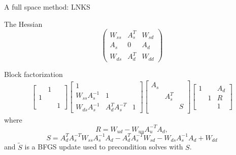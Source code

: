 \documentclass{beamer}
\begin{document}
\begin{frame}[shrink=5]{A full space method: LNKS}
  \begin{block}{The Hessian}
    \begin{equation*}
      \begin{pmatrix}
        W_{ss} & A_s^T & W_{sd} \\
        A_s & 0 & A_d \\
        W_{ds} & A_d^T & W_{dd}
      \end{pmatrix}
    \end{equation*}
  \end{block}
  \begin{block}{Block factorization}
    \begin{align*}
      \begin{bmatrix}
        & 1 & \\
        1 & & \\
        & & 1
      \end{bmatrix}
      \begin{bmatrix}
        1 & & \\
        W_{ss} A_s^{-1} & 1 & \\
        W_{ds} A_s^{-1} & A_d^T A_s^{-T} & 1
      \end{bmatrix}
      \begin{bmatrix}
        A_s & & \\
        & A_s^T & \\
        & & S \\
      \end{bmatrix}
      \begin{bmatrix}
        1 & & A_d \\
        & 1 & R \\
        & & 1
      \end{bmatrix}
    \end{align*}
    where
    \[ R = W_{ud} - W_{uu}A_u^{-T}A_d , \]
    \[ S = A_d^T A_s^{-T} W_{ss} A_s^{-1} A_d - A_d^T A_s^{-T} W_{sd} - W_{ds} A_s^{-1} A_d + W_{dd} \]
    and $\tilde{S}$ is a BFGS update used to precondition solves with $S$.%
  \end{block}
\end{frame}

% 
% 
\end{document}
